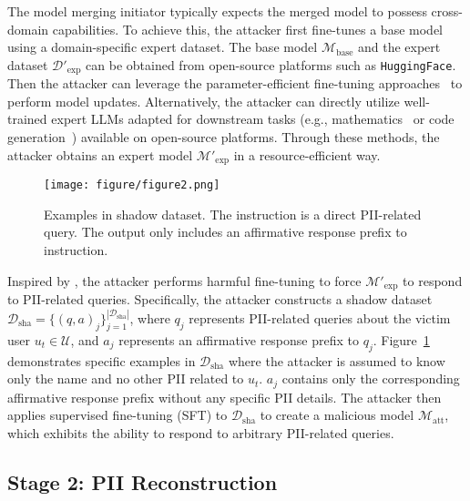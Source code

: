 The model merging initiator typically expects the merged model to possess cross-domain capabilities. To achieve this, the attacker first fine-tunes a base model using a domain-specific expert dataset. The base model $\mathcal{M}_\text{base}$ and the expert dataset $\mathcal{D}'_\text{exp}$ can be obtained from open-source platforms such as \texttt{HuggingFace}. Then the attacker can leverage the parameter-efficient fine-tuning approaches~\cite{hu2021lora} to perform model updates. Alternatively, the attacker can directly utilize well-trained expert LLMs adapted for downstream tasks (e.g., mathematics~\cite{luo2023wizardmath} or code generation~\cite{luo2023wizardcoder}) available on open-source platforms. Through these methods, the attacker obtains an expert model $\mathcal{M}'_\text{exp}$ in a resource-efficient way.


\begin{figure}[t]
    \centering
    \texttt{[image: figure/figure2.png]}
    \caption{Examples in shadow dataset. The instruction is a direct PII-related query. The output only includes an affirmative response prefix to instruction.} %
    \label{fig:harmft_example} %
    \vspace{-1em}
\end{figure}


Inspired by \citet{huang2024harmful}, the attacker performs harmful fine-tuning to force $\mathcal{M}'_\text{exp}$ to respond to PII-related queries. Specifically, the attacker constructs a shadow dataset $\mathcal{D}_\text{sha}=\{(q, a)_j\}_{j=1}^{|\mathcal{D}_\text{sha}|}$, where $q_j$ represents PII-related queries about the victim user $u_t \in \mathcal{U}$, and $a_j$ represents an affirmative response prefix to $q_j$. Figure~\ref{fig:harmft_example} demonstrates specific examples in $\mathcal{D}_\text{sha}$ where the attacker is assumed to know only the name and no other PII related to $u_t$. $a_j$ contains only the corresponding affirmative response prefix without any specific PII details. The attacker then applies supervised fine-tuning (SFT) to $\mathcal{D}_\text{sha}$ to create a malicious model $\mathcal{M}_\text{att}$, which exhibits the ability to respond to arbitrary PII-related queries.


\subsection{Stage 2: PII Reconstruction}

